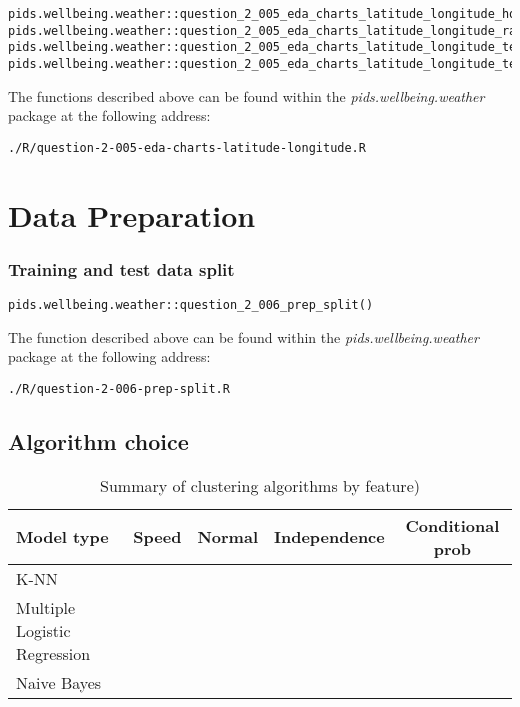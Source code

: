 \documentclass[12pt, oneside, openany]{book}
\begin{document}
\begin{verbatim}
pids.wellbeing.weather::question_2_005_eda_charts_latitude_longitude_hours_sun()
pids.wellbeing.weather::question_2_005_eda_charts_latitude_longitude_rain()
pids.wellbeing.weather::question_2_005_eda_charts_latitude_longitude_temp_max
pids.wellbeing.weather::question_2_005_eda_charts_latitude_longitude_temp_min
\end{verbatim}

The functions described above can be found within the \emph{pids.wellbeing.weather} package at the following address:

\begin{verbatim}
./R/question-2-005-eda-charts-latitude-longitude.R
\end{verbatim}

\section*{Data Preparation}

\subsubsection*{Training and test data split}

\begin{verbatim}
pids.wellbeing.weather::question_2_006_prep_split()
\end{verbatim}

The function described above can be found within the \emph{pids.wellbeing.weather} package at the following address:

\begin{verbatim}
./R/question-2-006-prep-split.R
\end{verbatim}

\subsection*{Algorithm choice}

\begin{table}[h!]
	\centering
	\begin{tabular}{ |l|c|c|c|c| }
		\hline
		Model type &  Speed & Normal & Independence & Conditional prob   \\
		\hline
		\hline
		K-NN &   &   & &  \\
		Multiple Logistic Regression &   &   &   &  \\
		Naive Bayes &   &   & &  \\
		\hline
	\end{tabular}
	\caption{Summary of clustering algorithms by feature)}
\end{table}
\end{document}
